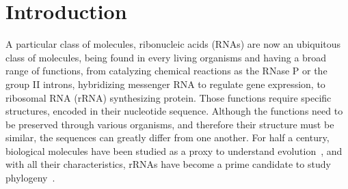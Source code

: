 \section{Introduction}
\label{sec:introduction}

A particular class of molecules,
ribonucleic acids (RNAs) are  now  an ubiquitous class of molecules, being
found in every living organisms and having a broad range of functions, from catalyzing
chemical reactions as the RNase P or the group II introns,
hybridizing  messenger RNA to regulate gene expression,
to ribosomal RNA (rRNA) synthesizing protein.
Those functions  require specific structures, 
encoded in their nucleotide sequence. Although the functions
need to be preserved through various organisms, and therefore
their structure must be similar,  the sequences
can greatly differ from one another.
For half a century, biological molecules have been studied as a proxy to understand
evolution~\cite{Zuckerkandl1965}, and with all their characteristics, rRNAs have
become a prime candidate to study phylogeny~\cite{Olsen1986, Olsen1993}.
